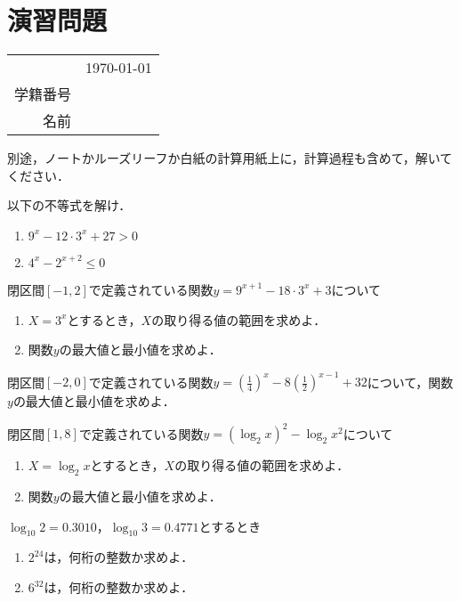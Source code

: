 \section*{演習問題}
\begin{table}[!t]
	\begin{flushright}
		\begin{tabular}{rc}
			& \usdate\today \\
			学籍番号 & \\
			名前 & \\
		\end{tabular}
	\end{flushright}
\end{table}
別途，ノートかルーズリーフか白紙の計算用紙上に，計算過程も含めて，解いてください．

\begin{question}
	以下の不等式を解け．
	\begin{enumerate}[(1)]
		\item $9^x-12\cdot3^x+27 > 0$
		\item $4^x - 2^{x+2} \leq 0$
	\end{enumerate}
\end{question}

\begin{question}
	閉区間$[-1, 2]$で定義されている関数$y = 9^{x+1}-18\cdot3^x+3$について
	\begin{enumerate}[(1)]
		\item $X=3^x$とするとき，$X$の取り得る値の範囲を求めよ．
		\item 関数$y$の最大値と最小値を求めよ．
	\end{enumerate}
\end{question}

\begin{question}
	閉区間$[-2, 0]$で定義されている関数$y = \left(\frac{1}{4}\right)^x-8\left(\frac{1}{2}\right)^{x-1}+32$について，関数$y$の最大値と最小値を求めよ．
\end{question}

\begin{question}
	閉区間$[1, 8]$で定義されている関数$y = (\log_2 x)^2 - \log_2 x^2$について
	\begin{enumerate}[(1)]
		\item $X=\log_2 x$とするとき，$X$の取り得る値の範囲を求めよ．
		\item 関数$y$の最大値と最小値を求めよ．
	\end{enumerate}
\end{question}

\begin{question}
	$\log_{10}2 = 0.3010$，$\log_{10}3=0.4771$とするとき
	\begin{enumerate}[(1)]
		\item $2^{24}$は，何桁の整数か求めよ．
		\item $6^{32}$は，何桁の整数か求めよ．
	\end{enumerate}
\end{question}
